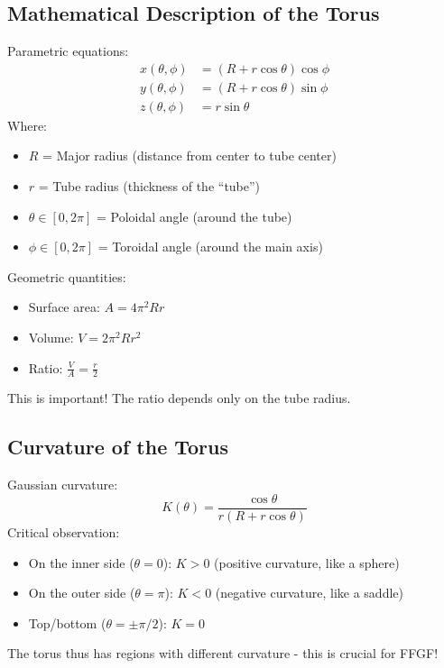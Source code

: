 \subsection{Mathematical Description of the Torus}
Parametric equations:
\begin{align}
	x(\theta, \phi) &= (R + r \cos \theta) \cos \phi \\
	y(\theta, \phi) &= (R + r \cos \theta) \sin \phi \\
	z(\theta, \phi) &= r \sin \theta
\end{align}
Where:
\begin{itemize}
	\item \( R \) = Major radius (distance from center to tube center)
	\item \( r \) = Tube radius (thickness of the ``tube'')
	\item \( \theta \in [0, 2\pi] \) = Poloidal angle (around the tube)
	\item \( \phi \in [0, 2\pi] \) = Toroidal angle (around the main axis)
\end{itemize}

Geometric quantities:
\begin{itemize}
	\item Surface area: \( A = 4\pi^2 R r \)
	\item Volume: \( V = 2\pi^2 R r^2 \)
	\item Ratio: \( \frac{V}{A} = \frac{r}{2} \)
\end{itemize}
This is important! The ratio depends only on the tube radius.

\subsection{Curvature of the Torus}
Gaussian curvature:
\[
K(\theta) = \frac{\cos \theta}{r(R + r \cos \theta)}
\]
Critical observation:
\begin{itemize}
	\item On the inner side (\( \theta = 0 \)): \( K > 0 \) (positive curvature, like a sphere)
	\item On the outer side (\( \theta = \pi \)): \( K < 0 \) (negative curvature, like a saddle)
	\item Top/bottom (\( \theta = \pm\pi/2 \)): \( K = 0 \)
\end{itemize}
The torus thus has regions with different curvature - this is crucial for FFGF!

